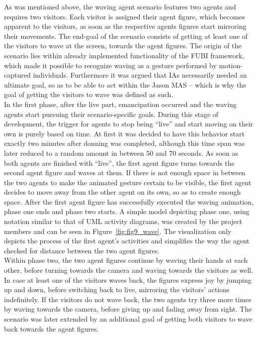 \documentclass[draft,final]{vutinfth} %
\begin{document}
As was mentioned above, the waving agent scenario features two agents and requires two visitors. 
Each visitor is assigned their agent figure, which becomes apparent to the visitors, as soon as the respective agents figures start mirroring their movements. 
The end-goal of the scenario consists of getting at least one of the visitors to wave at the screen, towards the agent figures. 
The origin of the scenario lies within already implemented functionality of the FUBI framework, which made it possible to recognize waving as a gesture performed by motion-captured individuals. 
Furthermore it was argued that IAs necessarily needed an ultimate goal, so as to be able to act within the Jason MAS – which is why the goal of getting the visitors to wave was defined as such. \\
In the first phase, after the live part, emancipation occurred and the waving agents start pursuing their scenario-specific goals. 
During this stage of development, the trigger for agents to stop being “live” and start moving on their own is purely based on time. 
At first it was decided to have this behavior start exactly two minutes after donning was completed, although this time span was later reduced to a random amount in between 50 and 70 seconds. 
As soon as both agents are finished with “live”, the first agent figure turns towards the second agent figure and waves at them. 
If there is not enough space in between the two agents to make the animated gesture certain to be visible, the first agent decides to move away from the other agent on its own, so as to create enough space. 
After the first agent figure has successfully executed the waving animation, phase one ends and phase two starts. 
A simple model depicting phase one, using notation similar to that of UML activity diagrams, was created by the project members and can be seen in Figure~\ref{fig:fig9_wave}. 
The visualization only depicts the process of the first agent’s activities and simplifies the way the agent checked for distance between the two agent figures. \\
Within phase two, the two agent figures continue by waving their hands at each other, before turning towards the camera and waving towards the visitors as well. 
In case at least one of the visitors waves back, the figures express joy by jumping up and down, before switching back to live, mirroring the visitors’ actions indefinitely. 
If the visitors do not wave back, the two agents try three more times by waving towards the camera, before giving up and fading away from sight. 
The scenario was later extended by an additional goal of getting both visitors to wave back towards the agent figures. \\
\end{document}
